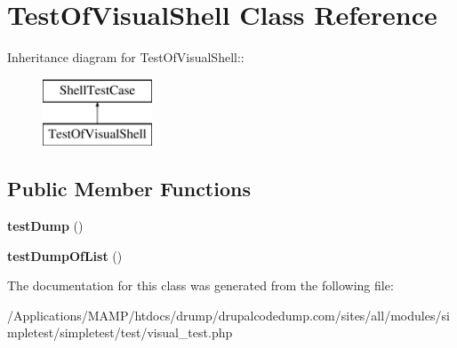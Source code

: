 \hypertarget{class_test_of_visual_shell}{
\section{TestOfVisualShell Class Reference}
\label{class_test_of_visual_shell}
}
Inheritance diagram for TestOfVisualShell::\begin{figure}[H]
\begin{center}
\leavevmode
\includegraphics[height=2cm]{class_test_of_visual_shell}
\end{center}
\end{figure}
\subsection*{Public Member Functions}
\begin{DoxyCompactItemize}
\item 
\hypertarget{class_test_of_visual_shell_a3cb39a45cdfe4e5ca768c5c271fe3b67}{
{\bfseries testDump} ()}
\label{class_test_of_visual_shell_a3cb39a45cdfe4e5ca768c5c271fe3b67}

\item 
\hypertarget{class_test_of_visual_shell_accf4dbc0da018f25e3cd4abff9b3948f}{
{\bfseries testDumpOfList} ()}
\label{class_test_of_visual_shell_accf4dbc0da018f25e3cd4abff9b3948f}

\end{DoxyCompactItemize}


The documentation for this class was generated from the following file:\begin{DoxyCompactItemize}
\item 
/Applications/MAMP/htdocs/drump/drupalcodedump.com/sites/all/modules/simpletest/simpletest/test/visual\_\-test.php\end{DoxyCompactItemize}
